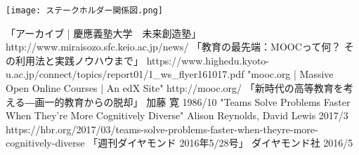 \documentclass[uplatex, a4j]{jsarticle}
\begin{document}
\begin{enumerate}
  \end{enumerate}

  \begin{center}
    \texttt{[image: ステークホルダー関係図.png]}
  \end{center}


\begin{thebibliography}{数字}
   「アーカイブ | 慶應義塾大学　未来創造塾」 http://www.miraisozo.sfc.keio.ac.jp/news/
   「教育の最先端：MOOCって何？ その利用法と実践ノウハウまで」 https://www.highedu.kyoto-u.ac.jp/connect/topics/report01/1\_ws\_flyer161017.pdf
   "mooc.org | Massive Open Online Courses | An edX Site" http://mooc.org/
   「新時代の高等教育を考える―画一的教育からの脱却」 加藤 寛 1986/10
   "Teams Solve Problems Faster When They’re More Cognitively Diverse" Alison Reynolds, David Lewis 2017/3 https://hbr.org/2017/03/teams-solve-problems-faster-when-theyre-more-cognitively-diverse
   「週刊ダイヤモンド 2016年5/28号」 ダイヤモンド社 2016/5
\end{thebibliography}
\end{document}
